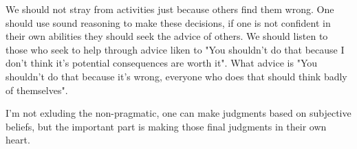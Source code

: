 \documentclass[12pt, a4paper]{article}
\begin{document}
We should not stray from activities just because others find them wrong. One should use sound reasoning to make these decisions, 
if one is not confident in their own abilities they should seek the advice of others. We should listen to those who seek to help
through advice liken to "You shouldn't do that because I don't think it's potential consequences are worth it". What advice is
"You shouldn't do that because it's wrong, everyone who does that should think badly of themselves". 

I'm not exluding the non-pragmatic, one can make judgments based on subjective beliefs, but the important part is making those
final judgments in their own heart. 
\end{document}
